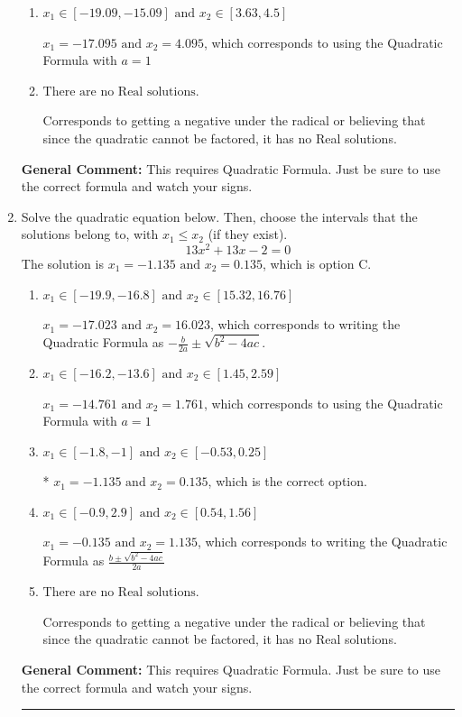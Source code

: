 \documentclass{extbook}[14pt]
\newcommand{\litem}[1]{\item #1

\rule{\textwidth}{0.4pt}}
\begin{document}
\begin{enumerate}
{\begin{enumerate}[label=\Alph*.]
 $x_1 = -1.709 \text{ and } x_2 = 0.409$, which corresponds to writing the Quadratic Formula as $\frac{b \pm \sqrt{b^2 - 4ac}}{2a}$
\item \( x_1 \in [-19.09, -15.09] \text{ and } x_2 \in [3.63, 4.5] \)

 $x_1 = -17.095 \text{ and } x_2 = 4.095$, which corresponds to using the Quadratic Formula with $a=1$
\item \( \text{There are no Real solutions.} \)

Corresponds to getting a negative under the radical or believing that since the quadratic cannot be factored, it has no Real solutions.
\end{enumerate}

\textbf{General Comment:} This requires Quadratic Formula. Just be sure to use the correct formula and watch your signs.
}
\litem{
Solve the quadratic equation below. Then, choose the intervals that the solutions belong to, with $x_1 \leq x_2$ (if they exist).
\[ 13x^{2} +13 x -2 = 0 \]The solution is \( x_1 = -1.135 \text{ and } x_2 = 0.135 \), which is option C.\begin{enumerate}[label=\Alph*.]
\item \( x_1 \in [-19.9, -16.8] \text{ and } x_2 \in [15.32, 16.76] \)

 $x_1 = -17.023 \text{ and } x_2 = 16.023$, which corresponds to writing the Quadratic Formula as $-\frac{b}{2a} \pm \sqrt{b^2 - 4ac}$.
\item \( x_1 \in [-16.2, -13.6] \text{ and } x_2 \in [1.45, 2.59] \)

 $x_1 = -14.761 \text{ and } x_2 = 1.761$, which corresponds to using the Quadratic Formula with $a=1$
\item \( x_1 \in [-1.8, -1] \text{ and } x_2 \in [-0.53, 0.25] \)

* $x_1 = -1.135 \text{ and } x_2 = 0.135$, which is the correct option.
\item \( x_1 \in [-0.9, 2.9] \text{ and } x_2 \in [0.54, 1.56] \)

 $x_1 = -0.135 \text{ and } x_2 = 1.135$, which corresponds to writing the Quadratic Formula as $\frac{b \pm \sqrt{b^2 - 4ac}}{2a}$
\item \( \text{There are no Real solutions.} \)

Corresponds to getting a negative under the radical or believing that since the quadratic cannot be factored, it has no Real solutions.
\end{enumerate}

\textbf{General Comment:} This requires Quadratic Formula. Just be sure to use the correct formula and watch your signs.
}
\end{enumerate}
\end{document}
